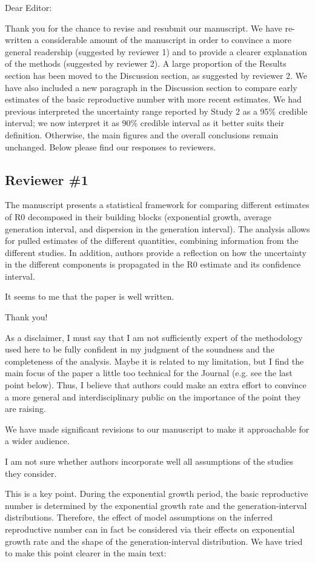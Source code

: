 \documentclass[12pt]{article}
\newcommand{\rev}{\subsection*}
\newcommand{\revtext}{\textsf}
\begin{document}
\noindent Dear Editor:

Thank you for the chance to revise and resubmit our manuscript. 
We have re-written a considerable amount of the manuscript in order to convince a more general readership (suggested by reviewer 1) and to provide a clearer explanation of the methods (suggested by reviewer 2).
A large proportion of the Results section has been moved to the Discussion section, as suggested by reviewer 2.
We have also included a new paragraph in the Discussion section to compare early estimates  of the basic reproductive number with more recent estimates.
We had previous interpreted the uncertainty range reported by Study 2 as a 95\% credible interval; we now interpret it as 90\% credible interval as it better suits their definition.
Otherwise, the main figures and the overall conclusions remain unchanged.
Below please find our responses to reviewers.

\rev{Reviewer \#1}

\revtext{
The manuscript presents a statistical framework for comparing different estimates of R0 decomposed in their building blocks (exponential growth, average generation interval, and dispersion in the generation interval). The analysis allows for pulled estimates of the different quantities, combining information from the different studies. In addition, authors provide a reflection on how the uncertainty in the different components is propagated in the R0 estimate and its confidence interval.}

\revtext{It seems to me that the paper is well written.}

Thank you!

\revtext{As a disclaimer, I must say that I am not sufficiently expert of the methodology used here to be fully confident in my judgment of the soundness and the completeness of the analysis. Maybe it is related to my limitation, but I find the main focus of the paper a little too technical for the Journal (e.g. see the last point below). Thus, I believe that authors could make an extra effort to convince a more general and interdisciplinary public on the importance of the point they are raising.}

We have made significant revisions to our manuscript to make it approachable for a wider audience.

\revtext{I am not sure whether authors incorporate well all assumptions of the studies they consider.} 

This is a key point. During the exponential growth period, the basic reproductive number is determined by the exponential growth rate and the generation-interval distributions.
Therefore, the effect of model assumptions on the inferred reproductive number can in fact be considered via their effects on exponential growth rate and the shape of the generation-interval distribution.
We have tried to make this point clearer in the main text:
\end{document}
